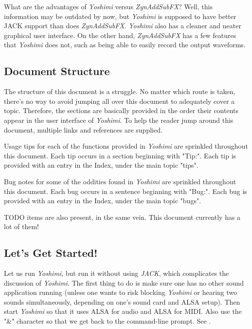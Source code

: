 \documentclass[
 11pt,
 twoside,
 a4paper,
 headinclude,
 footinclude,
 final                                 %
]{article}
\begin{document}
   What are the advantages of
   \textsl{Yoshimi} versus \textsl{ZynAddSubFX}?
   Well, this information may be outdated by now, but 
   \textsl{Yoshimi} is supposed to have better JACK support
   than does \textsl{ZynAddSubFX}.
   \textsl{Yoshimi} also has a cleaner and neater graphical user interface.
   On the other hand, \textsl{ZynAddSubFX} has a few features that
   \textsl{Yoshimi} does not, such as being able to easily record
   the output waveforms.

\subsection{Document Structure}
\label{subsec:introduction_document_structure}

   The structure of this document is a struggle.  No matter which route is
   taken, there's no way to avoid jumping all over this document to
   adequately cover a topic.  Therefore, the sections are basically provided
   in the order their contents appear in the user interface of
   \textsl{Yoshimi}.  To help the reader jump around this document, multiple
   links and references are supplied.

   Usage tips
   for each of the functions provided in
   \textsl{Yoshimi} are sprinkled throughout this document.
   Each tip occurs in a section beginning with "Tip:".
   Each tip is provided with an entry in the Index, under the
   main topic "tips".

   Bug notes
   for some of the oddities found in \textsl{Yoshimi} are
   sprinkled throughout this document.
   Each bug occurs in a sentence beginning with "Bug:".
   Each bug is provided with an entry in the Index, under the
   main topic "bugs".

   TODO items
   are also present, in the same vein.
   This document currently has a lot of them!

\subsection{Let's Get Started!}
\label{subsec:introduction_lets_get_started}

   Let us run \textsl{Yoshimi}, but run it without using \textsl{JACK}, which
   complicates the discussion of \textsl{Yoshimi}.  The first
   thing to do is make sure one has no other sound application running
   (unless one wants to risk blocking \textsl{Yoshimi} or hearing two sounds
   simultaneously, depending on one's sound card and ALSA setup).
   Then start \textsl{Yoshimi} so that it uses ALSA for audio and ALSA for
   MIDI.  Also use the "\&" character so that we get back to the
   command-line prompt.
   See .
\end{document}
